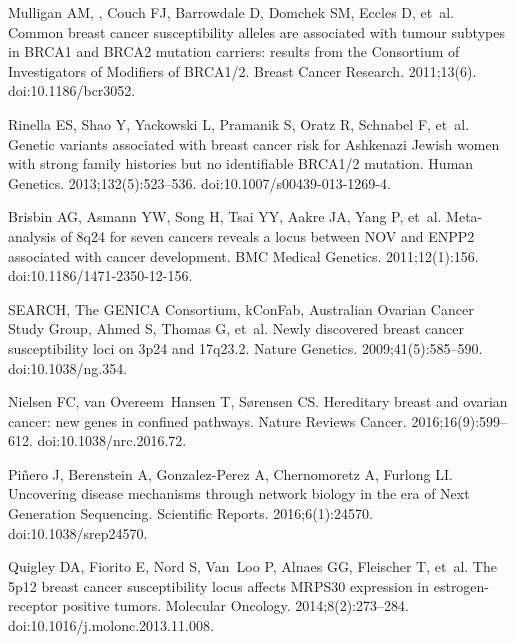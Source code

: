\documentclass[10pt,letterpaper]{article}
\begin{document}
\begin{thebibliography}{10}
  Mulligan AM, , Couch FJ, Barrowdale D, Domchek SM, Eccles D, et~al.
  \newblock Common breast cancer susceptibility alleles are associated with
    tumour subtypes in {BRCA}1 and {BRCA}2 mutation carriers: results from the
    Consortium of Investigators of Modifiers of {BRCA}1/2.
  \newblock Breast Cancer Research. 2011;13(6).
  \newblock doi:{10.1186/bcr3052}.
  
  Rinella ES, Shao Y, Yackowski L, Pramanik S, Oratz R, Schnabel F, et~al.
  \newblock Genetic variants associated with breast cancer risk for {Ashkenazi}
    {Jewish} women with strong family histories but no identifiable {BRCA}1/2
    mutation.
  \newblock Human Genetics. 2013;132(5):523--536.
  \newblock doi:{10.1007/s00439-013-1269-4}.
  
  Brisbin AG, Asmann YW, Song H, Tsai YY, Aakre JA, Yang P, et~al.
  \newblock Meta-analysis of 8q24 for seven cancers reveals a locus between {NOV}
    and {ENPP}2 associated with cancer development.
  \newblock BMC Medical Genetics. 2011;12(1):156.
  \newblock doi:{10.1186/1471-2350-12-156}.
  
  {SEARCH}, {The GENICA Consortium}, {kConFab}, {Australian Ovarian Cancer Study
    Group}, Ahmed S, Thomas G, et~al.
  \newblock Newly discovered breast cancer susceptibility loci on 3p24 and
    17q23.2.
  \newblock Nature Genetics. 2009;41(5):585--590.
  \newblock doi:{10.1038/ng.354}.
  
  Nielsen FC, van Overeem~Hansen T, Sørensen CS.
  \newblock Hereditary breast and ovarian cancer: new genes in confined pathways.
  \newblock Nature Reviews Cancer. 2016;16(9):599--612.
  \newblock doi:{10.1038/nrc.2016.72}.
  
  Piñero J, Berenstein A, Gonzalez-Perez A, Chernomoretz A, Furlong LI.
  \newblock Uncovering disease mechanisms through network biology in the era of
    {Next} {Generation} {Sequencing}.
  \newblock Scientific Reports. 2016;6(1):24570.
  \newblock doi:{10.1038/srep24570}.
  
  Quigley DA, Fiorito E, Nord S, Van~Loo P, Alnaes GG, Fleischer T, et~al.
  \newblock The 5p12 breast cancer susceptibility locus affects {MRPS}30
    expression in estrogen-receptor positive tumors.
  \newblock Molecular Oncology. 2014;8(2):273--284.
  \newblock doi:{10.1016/j.molonc.2013.11.008}.
  

\end{thebibliography}
\end{document}

